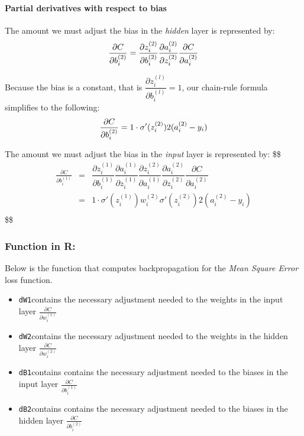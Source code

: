 \hypertarget{partial-derivatives-with-respect-to-bias}{%
\paragraph{Partial derivatives with respect to
bias}\label{partial-derivatives-with-respect-to-bias}}

The amount we must adjust the bias in the \emph{hidden} layer is
represented by: \[
\frac{\partial{C}}{\partial{b_i^{(2)}}}  =  \dfrac{\partial{z_i^{(2)}}}{\partial{b_i^{(2)}}}
     \dfrac{\partial{a_i^{(2)}}}{\partial{z_i^{(2)}}}
     \dfrac{\partial{C}}{\partial{a_i^{(2)}}} \\
\]

Because the bias is a constant, that is
\(\dfrac{\partial{z_i^{(l)}}}{\partial{b_i^{(l)}}} = 1\), our chain-rule
formula simplifies to the following: \[
\frac{\partial{C}}{\partial{b_i^{(2)}}} = 1 \cdot \sigma'(z_i^{(2)}) 2(a_i^{(2)}-y_i) \\
\]

The amount we must adjust the bias in the \emph{input} layer is
represented by: \$\$ \begin{eqnarray}
\frac{\partial{C}}{\partial{b_i^{(1)}}}    &=& \dfrac{\partial{z_i^{(1)}}}{\partial{b_i^{(1)}}} \dfrac{\partial{a_i^{(1)}}}{\partial{z_i^{(1)}}}  \dfrac{\partial{z_i^{(2)}}}{\partial{a_i^{(1)}}}
     \dfrac{\partial{a_i^{(2)}}}{\partial{z_i^{(2)}}}
     \dfrac{\partial{C}}{\partial{a_i^{(2)}}} \\
     
&=& 1 \cdot \sigma'(z_i^{(1)}) w_i^{(2)} \sigma'(z_i^{(2)}) 2(a_i^{(2)}-y_i) \\

\end{eqnarray} \$\$

\hypertarget{function-in-r-4}{%
\subsubsection{Function in R:}\label{function-in-r-4}}

Below is the function that computes backpropagation for the \emph{Mean
Square Error} loss function.

\begin{itemize}
\tightlist
\item
  \texttt{dW1}contains the necessary adjustment needed to the weights in
  the input layer \(\frac{\partial{C}}{\partial{w_i^{(1)}}}\)
\item
  \texttt{dW2}contains the necessary adjustment needed to the weights in
  the hidden layer \(\frac{\partial{C}}{\partial{w_i^{(2)}}}\)
\item
  \texttt{dB1}contains contains the necessary adjustment needed to the
  biases in the input layer \(\frac{\partial{C}}{\partial{b_i^{(1)}}}\)
\item
  \texttt{dB2}contains contains the necessary adjustment needed to the
  biases in the hidden layer \(\frac{\partial{C}}{\partial{b_i^{(2)}}}\)
\end{itemize}

